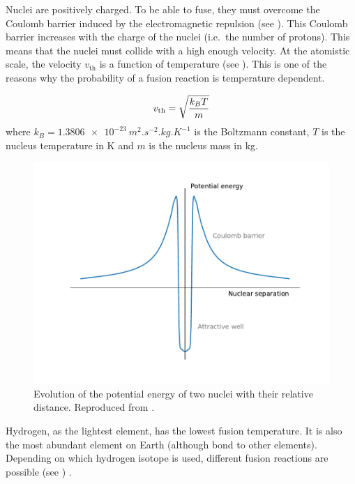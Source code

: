 Nuclei are positively charged.
To be able to fuse, they must overcome the Coulomb barrier induced by the electromagnetic repulsion (see ).
This Coulomb barrier increases with the charge of the nuclei (i.e.\ the number of protons).
This means that the nuclei must collide with a high enough velocity.
At the atomistic scale, the velocity $v_\mathrm{th}$ is a function of temperature (see ).
This is one of the reasons why the probability of a fusion reaction is temperature dependent.

\begin{equation}
    v_\mathrm{th} = \sqrt{\frac{k_B T}{m}}
    \labeq{thermal velocity}
\end{equation}
where $k_B = \SI{1.3806e-23}{m^2.s^{-2}.kg.K^{-1}}$ is the Boltzmann constant, $T$ is the nucleus temperature in \si{K} and $m$ is the nucleus mass in \si{kg}.


\begin{figure} [h]
    \centering
    \includegraphics[width=\linewidth]{Figures/Chapter1/potential_energy.pdf}
    \caption{Evolution of the potential energy of two nuclei with their relative distance. Reproduced from \cite{mccracken_fusion_2013}.}
\end{figure}

Hydrogen, as the lightest element, has the lowest fusion temperature.
It is also the most abundant element on Earth (although bond to other elements).
Depending on which hydrogen \gls{isotope} is used, different fusion reactions are possible (see ) .

